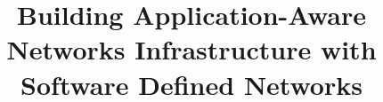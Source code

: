 \documentclass[onecolumn,draftclsnofoot]{hotsdn}
\begin{document}
%
\title{Building Application-Aware Networks Infrastructure with Software Defined Networks}



\author{ }



\maketitle


\begin{abstract}

\end{abstract}













\end{document}
